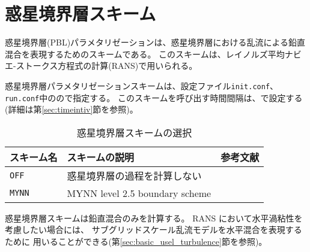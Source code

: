 
\section{惑星境界層スキーム} \label{sec:basic_usel_pbl}

惑星境界層(PBL)パラメタリゼーションは、惑星境界層における乱流による鉛直混合を表現するためのスキームである。
このスキームは、レイノルズ平均ナビエ-ストークス方程式の計算(RANS)で用いられる。

惑星境界層パラメタリゼーションスキームは、設定ファイル\verb|init.conf|、\verb|run.conf|中のので指定する。
このスキームを呼び出す時間間隔は、で設定する(詳細は第\ref{sec:timeintiv}節を参照)。

\begin{table}[h]
\begin{center}
  \caption{惑星境界層スキームの選択}
  \label{tab:nml_atm_bl}
  \begin{tabularx}{150mm}{lXX} \hline
    \rowcolor[gray]{0.9}  スキーム名 & スキームの説明 & 参考文献\\ \hline
      \verb|OFF|          & 惑星境界層の過程を計算しない &  \\
      \verb|MYNN|         & MYNN level 2.5 boundary scheme & \citet{my_1982,nakanishi_2004,nakanishi_2009} \\
    \hline
  \end{tabularx}
\end{center}
\end{table}

惑星境界層スキームは鉛直混合のみを計算する。
RANS において水平渦粘性を考慮したい場合には、
サブグリッドスケール乱流モデルを水平混合を表現するために
用いることができる(第\ref{sec:basic_usel_turbulence}節を参照)。
